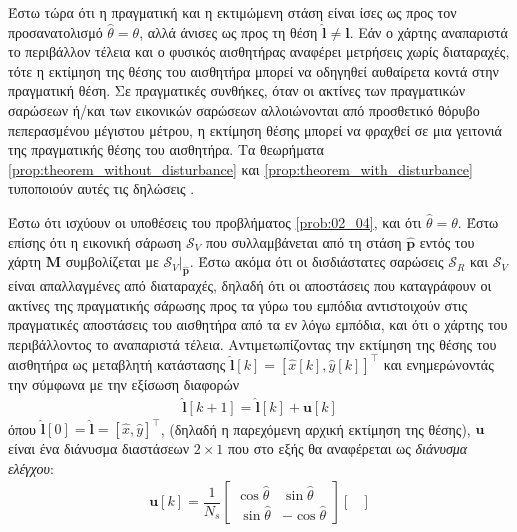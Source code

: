 Έστω τώρα ότι η πραγματική και η εκτιμώμενη στάση είναι ίσες ως προς τον
προσανατολισμό $\hat{\theta} = \theta$, αλλά άνισες ως προς τη θέση
$\hat{\bm{l}} \neq \bm{l}$. Εάν ο χάρτης αναπαριστά το περιβάλλον τέλεια και ο
φυσικός αισθητήρας αναφέρει μετρήσεις χωρίς διαταραχές, τότε η εκτίμηση της
θέσης του αισθητήρα μπορεί να οδηγηθεί αυθαίρετα κοντά στην πραγματική θέση. Σε
πραγματικές συνθήκες, όταν οι ακτίνες των πραγματικών σαρώσεων ή/και των
εικονικών σαρώσεων αλλοιώνονται από προσθετικό θόρυβο πεπερασμένου μέγιστου
μέτρου, η εκτίμηση θέσης μπορεί να φραχθεί σε μια γειτονιά της πραγματικής
θέσης του αισθητήρα. Τα θεωρήματα \ref{prop:theorem_without_disturbance} και
\ref{prop:theorem_with_disturbance} τυποποιούν αυτές τις δηλώσεις
\cite{Filotheou2022d}.


\begin{bw_box}
\begin{theorem}
  \label{prop:theorem_without_disturbance}
  Έστω ότι ισχύουν οι υποθέσεις του προβλήματος \ref{prob:02_04}, και ότι
  $\hat{\theta} = \theta$. Έστω επίσης ότι η εικονική σάρωση $\mathcal{S}_V$ που
  συλλαμβάνεται από τη στάση $\hat{\bm{p}}$ εντός του χάρτη $\bm{M}$
  συμβολίζεται με $\mathcal{S}_V|_{\bm{\hat{p}}}$. Έστω ακόμα ότι οι
  δισδιάστατες σαρώσεις $\mathcal{S}_R$ και $\mathcal{S}_V$ είναι απαλλαγμένες
  από διαταραχές, δηλαδή ότι οι αποστάσεις που καταγράφουν οι ακτίνες της
  πραγματικής σάρωσης προς τα γύρω του εμπόδια αντιστοιχούν στις πραγματικές
  αποστάσεις του αισθητήρα από τα εν λόγω εμπόδια, και ότι ο χάρτης του
  περιβάλλοντος το αναπαριστά τέλεια. Αντιμετωπίζοντας την
  εκτίμηση της θέσης του αισθητήρα ως μεταβλητή κατάστασης
  $\hat{\bm{l}}[k] = [\hat{x}[k], \hat{y}[k]]^\top$ και ενημερώνοντάς την
  σύμφωνα με την εξίσωση διαφορών
  \begin{align}
    \hat{\bm{l}}[k+1] = \hat{\bm{l}}[k] + \bm{u}[k]
    \label{eq:difference_equation_without_disturbance}
  \end{align}
  όπου $\hat{\bm{l}}[0] = \hat{\bm{l}} = [\hat{x}, \hat{y}]^{\top}$,
  (δηλαδή η παρεχόμενη αρχική εκτίμηση της θέσης), $\bm{u}$ είναι ένα διάνυσμα
  διαστάσεων $2 \times 1$ που στο εξής θα αναφέρεται ως
  \textit{διάνυσμα ελέγχου}:
  \begin{align}
    \bm{u}[k] = \dfrac{1}{N_s}
    \begin{bmatrix}
      \cos\hat{\theta} & \sin\hat{\theta} \\\
      \sin\hat{\theta} & - \cos\hat{\theta}
    \end{bmatrix}
    \begin{bmatrix}

\end{bmatrix}
\end{align}
\end{theorem}
\end{bw_box}
